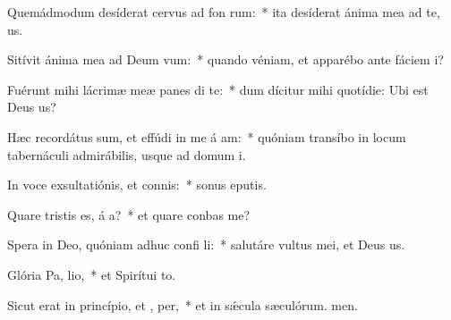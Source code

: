 \item Quemádmodum desíderat cervus ad fon rum:~* ita desíderat ánima mea ad te, us.
\item Sitívit ánima mea ad Deum  vum:~* quando véniam, et apparébo ante fáciem i?
\item Fuérunt mihi lácrimæ meæ panes di  te:~* dum dícitur mihi quotídie: Ubi est Deus us?
\item Hæc recordátus sum, et effúdi in me á am:~* quóniam transíbo in locum tabernáculi admirábilis, usque ad domum i.
\item In voce exsultatiónis, et connis:~* sonus eputis.
\item Quare tristis es, á a?~* et quare conbas me?
\item Spera in Deo, quóniam adhuc confi li:~* salutáre vultus mei, et Deus us.
\item Glória Pa,  lio,~* et Spirítui to.
\item Sicut erat in princípio, et ,  per,~* et in sǽcula sæculórum. men.
